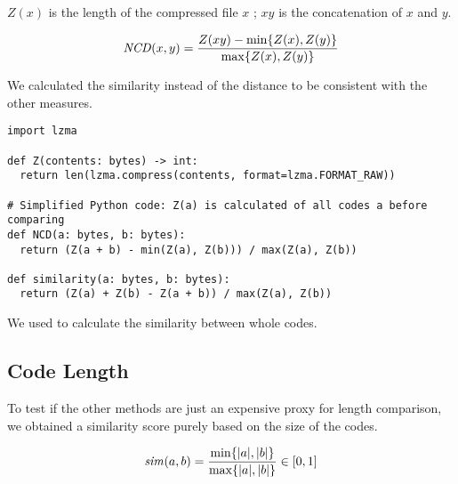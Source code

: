 \documentclass[../main.tex]{subfiles}
\begin{document}
$Z(x)$ is the length of the compressed file $x$ ; $xy$ is the concatenation of $x$ and $y$.

\begin{equation}
  \mbox{\textit{NCD}}(x,y) = \dfrac{Z(xy) - \min\{Z(x), Z(y)\}}{\max \{Z(x), Z(y)\}}
\end{equation}

We calculated the similarity instead of the distance to be consistent with the other measures.

\begin{lstlisting}[style=pymd]
import lzma

def Z(contents: bytes) -> int:
  return len(lzma.compress(contents, format=lzma.FORMAT_RAW))

# Simplified Python code: Z(a) is calculated of all codes a before comparing
def NCD(a: bytes, b: bytes):
  return (Z(a + b) - min(Z(a), Z(b))) / max(Z(a), Z(b))

def similarity(a: bytes, b: bytes):
  return (Z(a) + Z(b) - Z(a + b)) / max(Z(a), Z(b))
\end{lstlisting}

We used  to calculate the similarity between whole codes.

\subsection{Code Length \label{sec:size}}

To test if the other methods are just an expensive proxy for length comparison, we obtained a similarity score purely based on the size of the codes.

\begin{equation}
  \mbox{\textit{sim}}(a, b) = \dfrac{\min\{|a|,|b|\}}{\max\{|a|,|b|\}} \in [0,1]
  \label{eq:size}
\end{equation}
\end{document}
